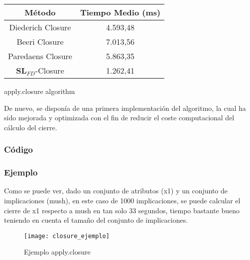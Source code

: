 \begin{center}
    \begin{tabular}{c c}
        \hline
        M\'etodo & Tiempo Medio (ms) \\
        \hline
        Diederich Closure & 4.593,48 \\   
        Beeri Closure & 7.013,56 \\   
        Paredaens Closure & 5.863,35 \\  
        \(\textbf{SL}_{FD}\)-Closure & 1.262,41 \\  
    \end{tabular}
\end{center}

\IncMargin{1em}
\begin{algorithm}[h]
    \SetAlgoLined
    \LinesNumbered
    \DontPrintSemicolon
    \caption{apply.closure algorithm}\label{alg:2}
\end{algorithm}\DecMargin{1em}
\bigskip

De nuevo, se dispon\'ia de una primera implementaci\'on del algoritmo, la cual ha sido mejorada y optimizada con el fin de reducir el coste computacional del c\'alculo del cierre.



\newpage
\subsubsection{C\'odigo} 

\subsubsection{Ejemplo}
Como se puede ver, dado un conjunto de atributos (x1) y un conjunto de implicaciones (mush), en este caso de 1000 implicaciones, se puede calcular el cierre de x1 respecto a mush en tan solo 33 segundos, tiempo bastante bueno teniendo en cuenta el tama\~no del conjunto de implicaciones. \\ 
\begin{figure}[h]
    \centering
    \texttt{[image: closure\_ejemplo]}
    \caption{Ejemplo apply.closure}
    \label{fig:closure_ejemplo}
\end{figure} 

